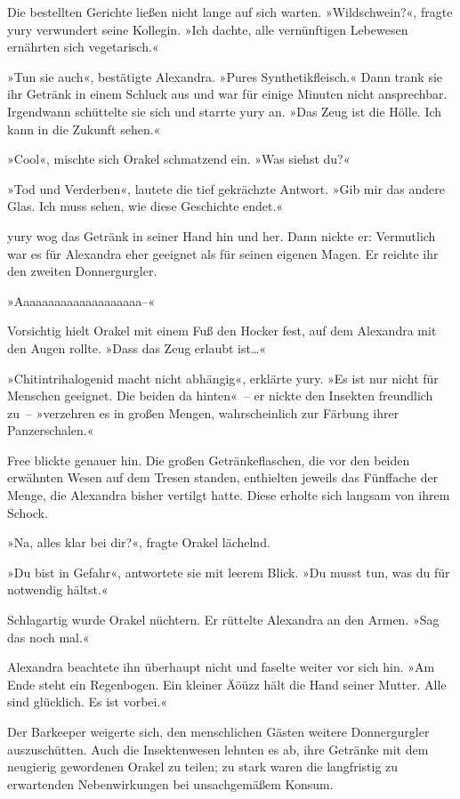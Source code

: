 Die bestellten Gerichte ließen nicht lange auf sich warten. »Wildschwein?«, fragte yury verwundert seine Kollegin. »Ich dachte, alle vernünftigen Lebewesen ernährten sich vegetarisch.«

»Tun sie auch«, bestätigte Alexandra. »Pures Synthetikfleisch.« Dann trank sie ihr Getränk in einem Schluck aus und war für einige Minuten nicht ansprechbar. Irgendwann schüttelte sie sich und starrte yury an. »Das Zeug ist die Hölle. Ich kann in die Zukunft sehen.«

»Cool«, mischte sich Orakel schmatzend ein. »Was siehst du?«

»Tod und Verderben«, lautete die tief gekrächzte Antwort. »Gib mir das andere Glas. Ich muss sehen, wie diese Geschichte endet.«

yury wog das Getränk in seiner Hand hin und her. Dann nickte er: Vermutlich war es für Alexandra eher geeignet als für seinen eigenen Magen. Er reichte ihr den zweiten Donnergurgler.

»Aaaaaaaaaaaaaaaaaaaa–«

Vorsichtig hielt Orakel mit einem Fuß den Hocker fest, auf dem Alexandra mit den Augen rollte. »Dass das Zeug erlaubt ist…«

»Chitintrihalogenid macht nicht abhängig«, erklärte yury. »Es ist nur nicht für Menschen geeignet. Die beiden da hinten«~– er nickte den Insekten freundlich zu~– »verzehren es in großen Mengen, wahrscheinlich zur Färbung ihrer Panzerschalen.«

Free blickte genauer hin. Die großen Getränkeflaschen, die vor den beiden erwähnten Wesen auf dem Tresen standen, enthielten jeweils das Fünffache der Menge, die Alexandra bisher vertilgt hatte. Diese erholte sich langsam von ihrem Schock.

»Na, alles klar bei dir?«, fragte Orakel lächelnd.

»Du bist in Gefahr«, antwortete sie mit leerem Blick. »Du musst tun, was du für notwendig hältst.«

Schlagartig wurde Orakel nüchtern. Er rüttelte Alexandra an den Armen. »Sag das noch mal.«

Alexandra beachtete ihn überhaupt nicht und faselte weiter vor sich hin. »Am Ende steht ein Regenbogen. Ein kleiner Äöüzz hält die Hand seiner Mutter. Alle sind glücklich.  Es ist vorbei.«

Der Barkeeper weigerte sich, den menschlichen Gästen weitere Donnergurgler auszuschütten. Auch die Insektenwesen lehnten es ab, ihre Getränke mit dem neugierig gewordenen Orakel zu teilen; zu stark waren die langfristig zu erwartenden Nebenwirkungen bei unsachgemäßem Konsum.

